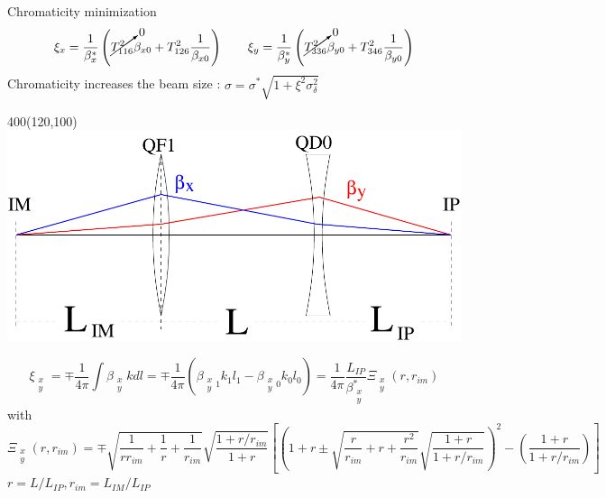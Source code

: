 \documentclass{beamer}
\begin{document}
\begin{frame}{Chromaticity minimization}
\begin{equation*}
 \xi_x = \frac{1}{\beta_x^*}\left(\cancelto{0}{T_{116}^2}\beta_{x0}+T_{126}^2\frac{1}{\beta_{x0}}\right)\qquad
 \xi_y = \frac{1}{\beta_y^*}\left(\cancelto{0}{T_{336}^2}\beta_{y0}+T_{346}^2\frac{1}{\beta_{y0}}\right)
\end{equation*}
Chromaticity increases the beam size : $\sigma = \sigma^* \sqrt{1+\xi^2\sigma_\delta^2}$
 \setlength{\TPHorizModule}{1pt}
  \setlength{\TPVertModule}{1pt}
\begin{textblock}{400}(120,100)
 \includegraphics[scale=0.25,angle=0]{fig01.pdf}
\end{textblock} 
\vspace*{2.2cm}
\begin{equation*}
  \xi_{\substack{x\\y}}=\mp\frac{1}{4\pi}\int\beta_{\substack{x\\y}}kdl =\mp\frac{1}{4\pi}\left(\beta_{\substack{x\\y}1}k_1l_1-\beta_{\substack{x\\y}0}k_0l_0\right)
 =\frac{1}{4\pi}\frac{L_{IP}}{\beta^*_{\substack{x\\y}}}\Xi_{\substack{x\\y}}(r,r_{im})
\end{equation*}
with{\tiny
\begin{equation}
 \Xi_{\substack{x\\y}}(r,r_{im})=\mp\sqrt{\frac{1}{rr_{im}}+\frac{1}{r}+\frac{1}{r_{im}}}\sqrt{\frac{1+r/r_{im}}{1+r}}\left[\left(1+r\pm\sqrt{\frac{r}{r_{im}}+r+\frac{r^2}{r_{im}}}\sqrt{\frac{1+r}{1+r/r_{im}}}\right)^2-\left(\frac{1+r}{1+r/r_{im}}\right)\right]
\end{equation}}
$r=L/L_{IP}, r_{im}=L_{IM}/L_{IP}$\par
\end{frame}
\end{document}
